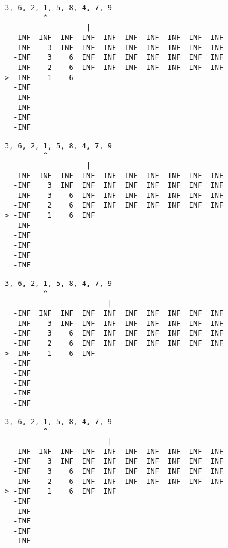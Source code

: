 { \begin{verbatim}
3, 6, 2, 1, 5, 8, 4, 7, 9
         ^
                   |
  -INF  INF  INF  INF  INF  INF  INF  INF  INF  INF
  -INF    3  INF  INF  INF  INF  INF  INF  INF  INF
  -INF    3    6  INF  INF  INF  INF  INF  INF  INF
  -INF    2    6  INF  INF  INF  INF  INF  INF  INF
> -INF    1    6                                   
  -INF                                             
  -INF                                             
  -INF                                             
  -INF                                             
  -INF                                             
\end{verbatim} }

{ \begin{verbatim}
3, 6, 2, 1, 5, 8, 4, 7, 9
         ^
                   |
  -INF  INF  INF  INF  INF  INF  INF  INF  INF  INF
  -INF    3  INF  INF  INF  INF  INF  INF  INF  INF
  -INF    3    6  INF  INF  INF  INF  INF  INF  INF
  -INF    2    6  INF  INF  INF  INF  INF  INF  INF
> -INF    1    6  INF                              
  -INF                                             
  -INF                                             
  -INF                                             
  -INF                                             
  -INF                                             
\end{verbatim} }

{ \begin{verbatim}
3, 6, 2, 1, 5, 8, 4, 7, 9
         ^
                        |
  -INF  INF  INF  INF  INF  INF  INF  INF  INF  INF
  -INF    3  INF  INF  INF  INF  INF  INF  INF  INF
  -INF    3    6  INF  INF  INF  INF  INF  INF  INF
  -INF    2    6  INF  INF  INF  INF  INF  INF  INF
> -INF    1    6  INF                              
  -INF                                             
  -INF                                             
  -INF                                             
  -INF                                             
  -INF                                             
\end{verbatim} }

{ \begin{verbatim}
3, 6, 2, 1, 5, 8, 4, 7, 9
         ^
                        |
  -INF  INF  INF  INF  INF  INF  INF  INF  INF  INF
  -INF    3  INF  INF  INF  INF  INF  INF  INF  INF
  -INF    3    6  INF  INF  INF  INF  INF  INF  INF
  -INF    2    6  INF  INF  INF  INF  INF  INF  INF
> -INF    1    6  INF  INF                         
  -INF                                             
  -INF                                             
  -INF                                             
  -INF                                             
  -INF                                             
\end{verbatim} }

